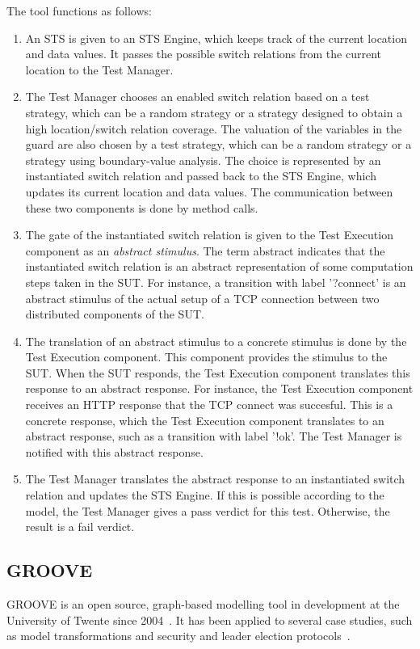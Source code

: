 The tool functions as follows: 
\begin{enumerate}
  \item An STS is given to an STS Engine, which keeps track of the current location and data values. It passes the possible switch relations from the current location to the Test Manager.
  \item The Test Manager chooses an enabled switch relation based on a test strategy, which can be a random strategy or a strategy designed to obtain a high location/switch relation coverage. The valuation of the variables in the guard are also chosen by a test strategy, which can be a random strategy or a strategy using boundary-value analysis. The choice is represented by an instantiated switch relation and passed back to the STS Engine, which updates its current location and data values. The communication between these two components is done by method calls.
  \item The gate of the instantiated switch relation is given to the Test Execution component as an \textit{abstract stimulus}. The term abstract indicates that the instantiated switch relation is an abstract representation of some computation steps taken in the SUT. For instance, a transition with label '?connect' is an abstract stimulus of the actual setup of a TCP connection between two distributed components of the SUT. 
  \item The translation of an abstract stimulus to a concrete stimulus is done by the Test Execution component. This component provides the stimulus to the SUT. When the SUT responds, the Test Execution component translates this response to an abstract response. For instance, the Test Execution component receives an HTTP response that the TCP connect was succesful. This is a concrete response, which the Test Execution component translates to an abstract response, such as a transition with label '!ok'. The Test Manager is notified with this abstract response.
  \item The Test Manager translates the abstract response to an instantiated switch relation and updates the STS Engine. If this is possible according to the model, the Test Manager gives a pass verdict for this test. Otherwise, the result is a fail verdict.
\end{enumerate}

\subsection{GROOVE}\label{sec:descriptiongroove}
GROOVE is an open source, graph-based modelling tool in development at the University of Twente since 2004~\cite{Rensink:GROOVE}. It has been applied to several case studies, such as model transformations and security and leader election protocols~\cite{Ghamarian:GROOVE}.

